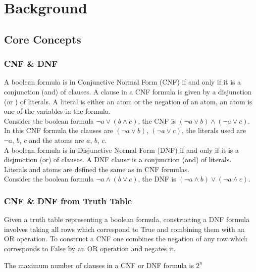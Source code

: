 \chapter{Background}\label{C:backgroundsurvey}
\section{Core Concepts}
\subsection{CNF \& DNF}
A boolean formula is in Conjunctive Normal Form (CNF) if and only if it is a conjunction (and) of clauses. A clause in a CNF formula is given by a disjunction (or ) of literals. A literal is either an atom or the negation of an atom, an atom is one of the variables in the formula.\\

Consider the boolean formula $\lnot a \lor (b \land c)$, the CNF is $(\lnot a \lor b) \land (\lnot a \lor c)$. In this CNF formula the clauses are $(\lnot a \lor b)$, $(\lnot a \lor c)$, the literals used are $\lnot a$, $b$, $c$ and the atoms are $a$, $b$, $c$.\\

A boolean formula is in Disjunctive Normal Form (DNF) if and only if it is a disjunction (or) of clauses. A DNF clause is a conjunction (and) of literals. Literals and atoms are defined the same as in CNF formulas.\\

Consider the boolean formula $\lnot a \land (b \lor c)$, the DNF is $(\lnot a \land b) \lor (\lnot a \land c)$.\\

\subsection{CNF \& DNF from Truth Table} \label{subsec:construct-cnfdnf}
Given a truth table representing a boolean formula, constructing a DNF formula involves taking all rows which correspond to True and combining them with an OR operation. To construct a CNF one combines the negation of any row which corresponds to False by an OR operation and negates it.

\begin{theorem}
	The maximum number of clauses in a CNF or DNF formula is $2^n$
	\label{thm:max-clause-cnfdnf}
\end{theorem}

